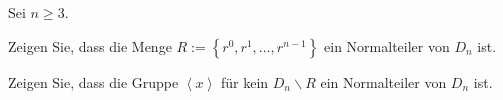\begin{Problem}
	Sei $n\ge 3$. 
	\begin{parts}
	\item Zeigen Sie, dass die Menge $R:=\left\{ r^0, r^1, \dots, r^{n-1} \right\} $ ein Normalteiler von $D_n$ ist.
	\item Zeigen Sie, dass die Gruppe $\left<x \right>$ f\"{u}r kein $D_n\backslash R$ ein Normalteiler von $D_n$ ist.
	\end{parts}
\end{Problem}
